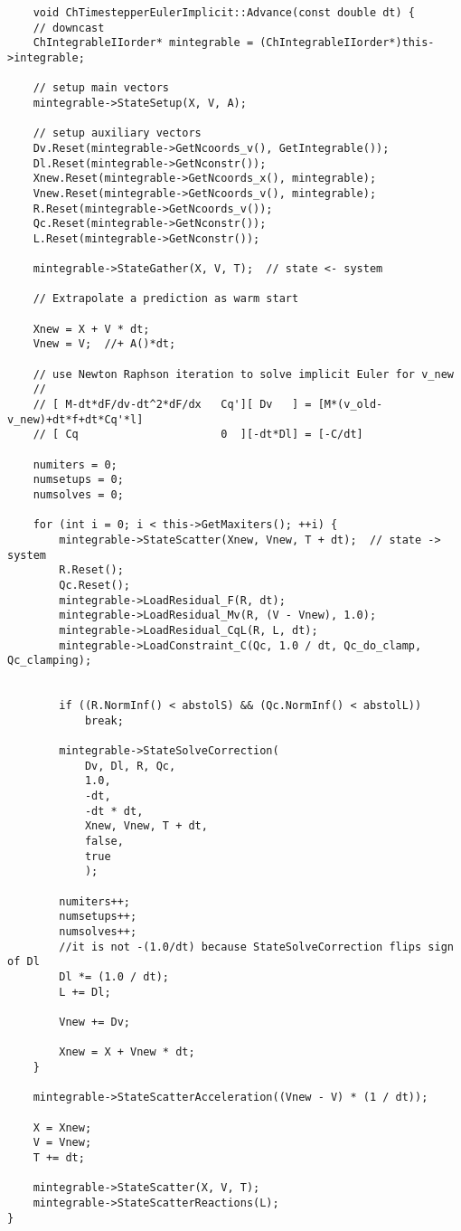 \begin{verbatim}
    void ChTimestepperEulerImplicit::Advance(const double dt) {
    // downcast
    ChIntegrableIIorder* mintegrable = (ChIntegrableIIorder*)this->integrable;

    // setup main vectors
    mintegrable->StateSetup(X, V, A);

    // setup auxiliary vectors
    Dv.Reset(mintegrable->GetNcoords_v(), GetIntegrable());
    Dl.Reset(mintegrable->GetNconstr());
    Xnew.Reset(mintegrable->GetNcoords_x(), mintegrable);
    Vnew.Reset(mintegrable->GetNcoords_v(), mintegrable);
    R.Reset(mintegrable->GetNcoords_v());
    Qc.Reset(mintegrable->GetNconstr());
    L.Reset(mintegrable->GetNconstr());

    mintegrable->StateGather(X, V, T);  // state <- system

    // Extrapolate a prediction as warm start

    Xnew = X + V * dt;
    Vnew = V;  //+ A()*dt;

    // use Newton Raphson iteration to solve implicit Euler for v_new
    //
    // [ M-dt*dF/dv-dt^2*dF/dx   Cq'][ Dv   ] = [M*(v_old-v_new)+dt*f+dt*Cq'*l]
    // [ Cq                      0  ][-dt*Dl] = [-C/dt]

    numiters = 0;
    numsetups = 0;
    numsolves = 0;

    for (int i = 0; i < this->GetMaxiters(); ++i) {
        mintegrable->StateScatter(Xnew, Vnew, T + dt);  // state -> system
        R.Reset();
        Qc.Reset();
        mintegrable->LoadResidual_F(R, dt);
        mintegrable->LoadResidual_Mv(R, (V - Vnew), 1.0);
        mintegrable->LoadResidual_CqL(R, L, dt);
        mintegrable->LoadConstraint_C(Qc, 1.0 / dt, Qc_do_clamp, Qc_clamping);


        if ((R.NormInf() < abstolS) && (Qc.NormInf() < abstolL))
            break;

        mintegrable->StateSolveCorrection(
            Dv, Dl, R, Qc,
            1.0,                 
            -dt,                 
            -dt * dt,            
            Xnew, Vnew, T + dt,  
            false,               
            true                 
            );

        numiters++;
        numsetups++;
        numsolves++;
        //it is not -(1.0/dt) because StateSolveCorrection flips sign of Dl
        Dl *= (1.0 / dt);  
        L += Dl;

        Vnew += Dv;

        Xnew = X + Vnew * dt;
    }

    mintegrable->StateScatterAcceleration((Vnew - V) * (1 / dt));  

    X = Xnew;
    V = Vnew;
    T += dt;

    mintegrable->StateScatter(X, V, T);      
    mintegrable->StateScatterReactions(L);   
}
\end{verbatim}


